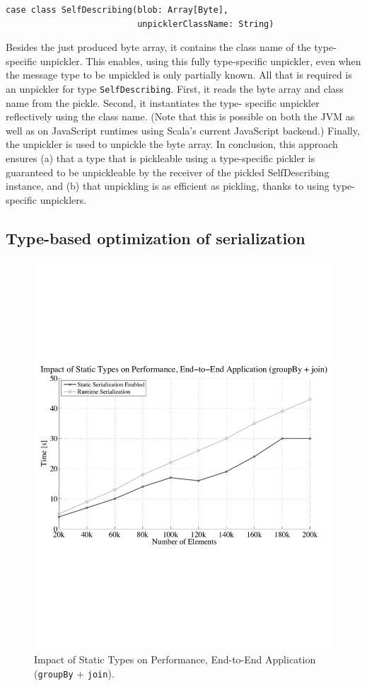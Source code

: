 \documentclass[preprint]{sigplanconf}
\theoremstyle{definition}
\theoremstyle{definition}
\begin{document}
\begin{lstlisting}
case class SelfDescribing(blob: Array[Byte],
                          unpicklerClassName: String)
\end{lstlisting}

Besides the just produced byte array, it contains the class name of the type-
specific unpickler. This enables, using this fully type-specific unpickler,
even when the message type to be unpickled is only partially known. All that
is required is an unpickler for type \verb|SelfDescribing|. First, it reads
the byte array and class name from the pickle. Second, it instantiates the
type- specific unpickler reflectively using the class name. (Note that this is
possible on both the JVM as well as on JavaScript runtimes using Scala's
current JavaScript backend.) Finally, the unpickler is used to unpickle the
byte array. In conclusion, this approach ensures (a) that a type that is
pickleable using a type-specific pickler is guaranteed to be unpickleable by
the receiver of the pickled SelfDescribing instance, and (b) that unpickling
is as efficient as pickling, thanks to using type-specific unpicklers.

\subsection{Type-based optimization of serialization}

\begin{figure}[t!]
\centering\includegraphics[width=\columnwidth]{multipleJVM.pdf}
\caption{Impact of Static Types on Performance, End-to-End Application (\texttt{groupBy} + \texttt{join}).}
\label{fig:multiple-jvm}
\end{figure}
\end{document}
